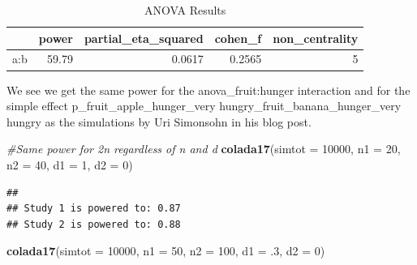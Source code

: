\documentclass[]{book}
\newenvironment{Shaded}{\begin{snugshade}}{\end{snugshade}}
\newcommand{\CommentTok}[1]{\textcolor[rgb]{0.56,0.35,0.01}{\textit{#1}}}
\newcommand{\DataTypeTok}[1]{\textcolor[rgb]{0.13,0.29,0.53}{#1}}
\newcommand{\DecValTok}[1]{\textcolor[rgb]{0.00,0.00,0.81}{#1}}
\newcommand{\FloatTok}[1]{\textcolor[rgb]{0.00,0.00,0.81}{#1}}
\newcommand{\KeywordTok}[1]{\textcolor[rgb]{0.13,0.29,0.53}{\textbf{#1}}}
\newcommand{\NormalTok}[1]{#1}
\newcommand{\OperatorTok}[1]{\textcolor[rgb]{0.81,0.36,0.00}{\textbf{#1}}}
\newcommand{\OtherTok}[1]{\textcolor[rgb]{0.56,0.35,0.01}{#1}}
\newcommand{\StringTok}[1]{\textcolor[rgb]{0.31,0.60,0.02}{#1}}
\begin{document}
\begin{Shaded}
\end{Shaded}

\begin{table}[t]

\caption{\label{tab:unnamed-chunk-161}ANOVA Results}
\centering
\begin{tabular}{l|r|r|r|r}
\hline
  & power & partial\_eta\_squared & cohen\_f & non\_centrality\\
\hline
a:b & 59.79 & 0.0617 & 0.2565 & 5\\
\hline
\end{tabular}
\end{table}

We see we get the same power for the anova\_fruit:hunger interaction and for the simple effect p\_fruit\_apple\_hunger\_very hungry\_fruit\_banana\_hunger\_very hungry as the simulations by Uri Simonsohn in his blog post.

\begin{Shaded}
\begin{Highlighting}[]
\CommentTok{#Same power for 2n regardless of n and d}
\KeywordTok{colada17}\NormalTok{(}\DataTypeTok{simtot =} \DecValTok{10000}\NormalTok{, }\DataTypeTok{n1 =} \DecValTok{20}\NormalTok{, }\DataTypeTok{n2 =} \DecValTok{40}\NormalTok{, }\DataTypeTok{d1 =} \DecValTok{1}\NormalTok{, }\DataTypeTok{d2 =} \DecValTok{0}\NormalTok{)  }
\end{Highlighting}
\end{Shaded}

\begin{verbatim}
## 
## Study 1 is powered to: 0.87
## Study 2 is powered to: 0.88
\end{verbatim}

\begin{Shaded}
\begin{Highlighting}[]
\KeywordTok{colada17}\NormalTok{(}\DataTypeTok{simtot =} \DecValTok{10000}\NormalTok{, }\DataTypeTok{n1 =} \DecValTok{50}\NormalTok{, }\DataTypeTok{n2 =} \DecValTok{100}\NormalTok{, }\DataTypeTok{d1 =} \FloatTok{.3}\NormalTok{, }\DataTypeTok{d2 =} \DecValTok{0}\NormalTok{)}
\end{Highlighting}
\end{Shaded}
\end{document}
